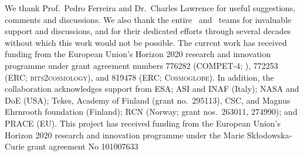 \begin{acknowledgements}
  We thank Prof.\ Pedro Ferreira and Dr.\ Charles Lawrence for useful suggestions, comments and 
  discussions. We also thank the entire \Planck\ and \WMAP\ teams for
  invaluable support and discussions, and for their dedicated efforts
  through several decades without which this work would not be
  possible. The current work has received funding from the European
  Union’s Horizon 2020 research and innovation programme under grant
  agreement numbers 776282 (COMPET-4; \BP), 772253 (ERC;
  \textsc{bits2cosmology}), and 819478 (ERC; \textsc{Cosmoglobe}). In
  addition, the collaboration acknowledges support from ESA; ASI and
  INAF (Italy); NASA and DoE (USA); Tekes, Academy of Finland (grant
   no.\ 295113), CSC, and Magnus Ehrnrooth foundation (Finland); RCN
  (Norway; grant nos.\ 263011, 274990); and PRACE (EU).
  This project has received funding from the European Union’s Horizon 2020 research and innovation programme under the Marie Skłodowska-Curie grant agreement No 101007633
\end{acknowledgements}
